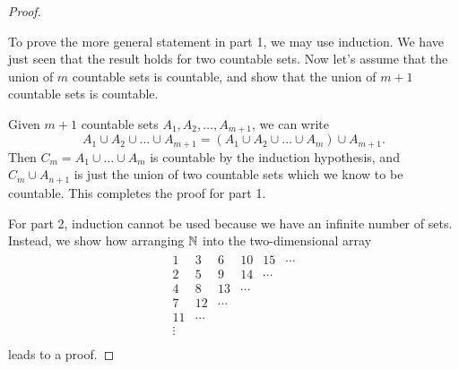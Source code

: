 \begin{proof}
  \begin{tightfigure}
    \centering
  \end{tightfigure}

  To prove the more general statement in part 1, we may use
  induction. We have just seen that the result holds for two
  countable sets. Now let's assume that the union of $m$ countable
  sets is countable, and show that the union of $m + 1$ countable
  sets is countable.

  Given $m + 1$ countable sets $A_1, A_2, \dots, A_{m + 1}$, we can write
  \[ A_1 \cup A_2 \cup \dots \cup A_{m + 1} = (A_1 \cup A_2 \cup
  \dots \cup A_m) \cup A_{m + 1}. \]
  Then $C_m = A_1 \cup \dots \cup A_m$ is countable by the induction
  hypothesis, and $C_m \cup A_{n + 1}$ is just the union of two
  countable sets which we know to be countable. This completes the
  proof for part 1.

  For part 2, induction cannot be used because we have an infinite
  number of sets. Instead, we show how arranging $\mathbb N$ into the
  two-dimensional array
  \begin{align*}
    \begin{array}{cccccc}
      1  & 3  & 6  & 10 & 15 & \cdots \\
      2  & 5  & 9  & 14 & \cdots \\
      4  & 8  & 13 & \cdots \\
      7  & 12 & \cdots \\
      11 & \cdots \\
      \vdots \\
    \end{array}
  \end{align*}
  leads to a proof.


\end{proof}
